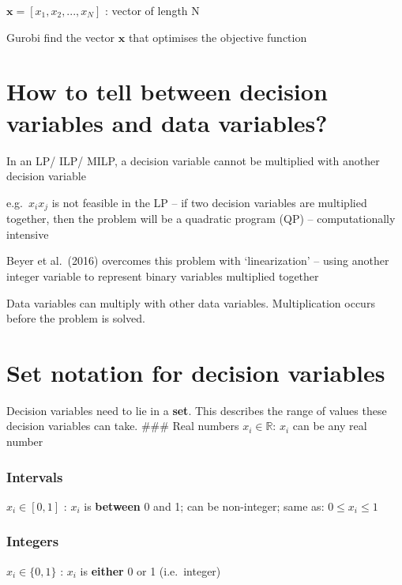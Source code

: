 \documentclass[
]{article}
\begin{document}
\(\mathbf{x} = [x_1, x_2, ..., x_N]\) : vector of length N

Gurobi find the vector \(\mathbf{x}\) that optimises the objective
function

\hypertarget{how-to-tell-between-decision-variables-and-data-variables}{%
\section{How to tell between decision variables and data
variables?}\label{how-to-tell-between-decision-variables-and-data-variables}}

In an LP/ ILP/ MILP, a decision variable cannot be multiplied with
another decision variable

e.g.~\(x_ix_j\) is not feasible in the LP -- if two decision variables
are multiplied together, then the problem will be a quadratic program
(QP) -- computationally intensive

Beyer et al.~(2016) overcomes this problem with `linearization' -- using
another integer variable to represent binary variables multiplied
together

Data variables can multiply with other data variables. Multiplication
occurs before the problem is solved.

\hypertarget{set-notation-for-decision-variables}{%
\section{Set notation for decision
variables}\label{set-notation-for-decision-variables}}

Decision variables need to lie in a \textbf{set}. This describes the
range of values these decision variables can take. \#\#\# Real numbers
\(x_i \in \mathbb{R}\): \(x_i\) can be any real number

\hypertarget{intervals}{%
\subsubsection{Intervals}\label{intervals}}

\(x_i \in [0,1]\) : \(x_i\) is \textbf{between} 0 and 1; can be
non-integer; same as: \(0 \leq x_i \leq 1\)

\hypertarget{integers}{%
\subsubsection{Integers}\label{integers}}

\(x_i \in \{0,1\}\) : \(x_i\) is \textbf{either} 0 or 1 (i.e.~integer)
\end{document}
